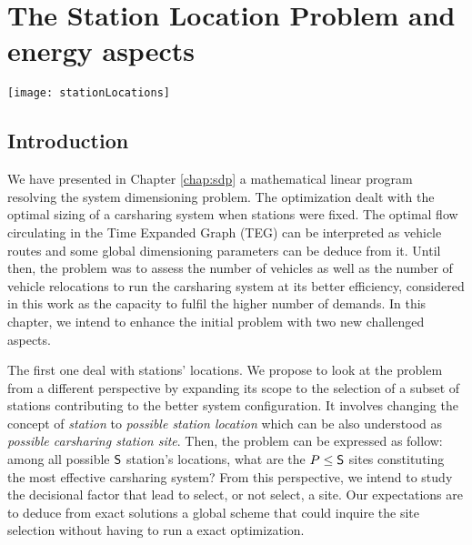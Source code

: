 \chapter{The Station Location Problem and energy aspects} \label{chap:slp}
\begin{bibunit}[ieeetr]
\minitoc
\vspace{2cm}

\begin{minipage}[c]{0.45\linewidth}
\texttt{[image: stationLocations]}
\end{minipage}
\hfill
\begin{minipage}[c]{0.45\linewidth}
\begin{abstract}
~
\end{abstract}
\end{minipage}

\newpage
\section{Introduction}
We have presented in Chapter \ref{chap:sdp} a mathematical linear program resolving the system dimensioning problem.
The optimization dealt with the optimal sizing of a carsharing system when stations were fixed.
The optimal flow circulating in the Time Expanded Graph (TEG) can be interpreted as vehicle routes and some global dimensioning parameters can be deduce from it.
Until then, the problem was to assess the number of vehicles as well as the number of vehicle relocations to run the carsharing system at its better efficiency, considered in this work as the capacity to fulfil the higher number of demands.
In this chapter, we intend to enhance the initial problem with two new challenged aspects.

\bigskip
The first one deal with stations' locations.
We propose to look at the problem from a different perspective by expanding its scope to the selection of a subset of stations contributing to the better system configuration.
It involves changing the concept of \emph{station} to \emph{possible station location} which can be also understood as \emph{possible carsharing station site}.
Then, the problem can be expressed as follow: among all possible $\mathsf{S}$ station's locations, what are the $P \leq \mathsf{S}$ sites constituting the most effective carsharing system?
From this perspective, we intend to study the decisional factor that lead to select, or not select, a site.
Our expectations are to deduce from exact solutions a global scheme that could inquire the site selection without having to run a exact optimization.


\end{bibunit}
